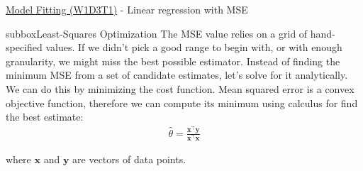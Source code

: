 \begin{textbox}{\href{https://compneuro.neuromatch.io/tutorials/W1D3_ModelFitting/chapter_title.html}{Model Fitting (W1D3T1)} -  Linear regression with MSE}
\begin{subbox}{subbox}{Least-Squares Optimization}
\scriptsize
The MSE value relies on a grid of hand-specified values. If we didn't pick a good range to begin with, or with enough granularity, we might miss the best possible estimator. Instead of finding the minimum MSE from a set of candidate estimates, let's solve for it analytically.
We can do this by minimizing the cost function. Mean squared error is a convex objective function, therefore we can compute its minimum using calculus for find the best estimate: \begin{align}
\hat\theta = \frac{\mathbf{x}^\top \mathbf{y}}{\mathbf{x}^\top \mathbf{x}}
\end{align}

where $\mathbf{x}$ and $\mathbf{y}$ are vectors of data points.

\end{subbox}

\end{textbox}

